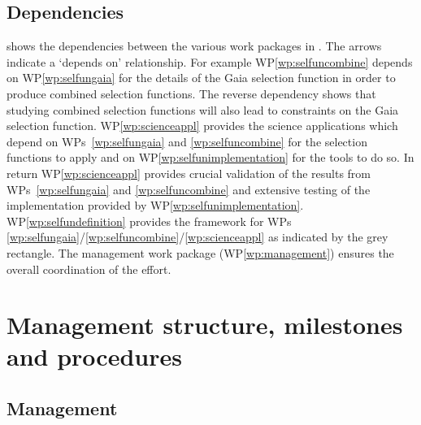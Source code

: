 \subsection{Dependencies}
\label{sec:dependencies}

 shows the dependencies between the various work packages in \acro. The arrows indicate a ‘depends on’ relationship. For example WP\ref{wp:selfuncombine} depends on WP\ref{wp:selfungaia} for the details of the Gaia selection function in order to produce combined selection functions. The reverse dependency shows that studying combined selection functions will also lead to constraints on the Gaia selection function. WP\ref{wp:scienceappl} provides the science applications which depend on WPs~\ref{wp:selfungaia} and \ref{wp:selfuncombine} for the selection functions to apply and on WP\ref{wp:selfunimplementation} for the tools to do so. In return WP\ref{wp:scienceappl} provides crucial validation of the results from WPs~\ref{wp:selfungaia} and \ref{wp:selfuncombine} and extensive testing of the implementation provided by WP\ref{wp:selfunimplementation}. WP\ref{wp:selfundefinition} provides the framework for WPs \ref{wp:selfungaia}/\ref{wp:selfuncombine}/\ref{wp:scienceappl} as indicated by the grey rectangle. The management work package (WP\ref{wp:management}) ensures the overall coordination of the {\acro} effort.

\section{Management structure, milestones and procedures}
\label{sec:management}

\subsection{Management}
\label{sec:mgtdetails}

